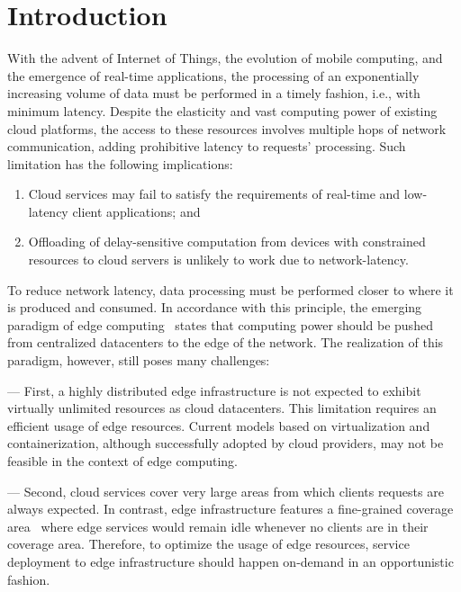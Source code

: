 \section{Introduction}

With the advent of Internet of Things, the evolution of mobile computing, and the emergence of real-time applications, the processing of an exponentially increasing volume of data must be performed in a timely fashion, i.e., with minimum latency. Despite the elasticity and vast computing power of existing cloud platforms, the access to these resources involves multiple hops of network communication, adding prohibitive latency to requests' processing. Such limitation has the following implications:

\begin{enumerate}

\item Cloud services may fail to satisfy the requirements of real-time and low-latency client applications; and

\item Offloading of delay-sensitive computation from devices with constrained resources to cloud servers is unlikely to work due to network-latency.

\end{enumerate}

To reduce network latency, data processing must be performed closer to where it is produced and consumed. In accordance with this principle, the emerging paradigm of edge computing~\cite{} states that computing power should be pushed from centralized datacenters to the edge of the network. The realization of this paradigm, however, still poses many challenges:

%
--- First, a highly distributed edge infrastructure is not expected to exhibit virtually unlimited resources as cloud datacenters. This limitation requires an efficient usage of edge resources. Current models based on virtualization and containerization, although successfully adopted by cloud providers, may not be feasible in the context of edge computing.

--- Second, cloud services cover very large areas from which clients requests are always expected. In contrast, edge infrastructure features a fine-grained coverage area~\cite{Dehos14millimeter5g} where edge services would remain idle whenever no clients are in their coverage area. Therefore, to optimize the usage of edge resources, service deployment to edge infrastructure should happen on-demand in an opportunistic fashion. 

